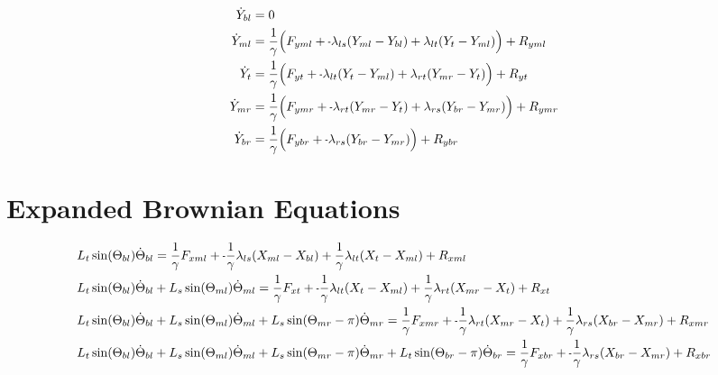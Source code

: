\documentclass[11pt, landscape]{article}
\newcommand{\mn}{\scalebox{0.7}[1.0]{-}}
\begin{document}
\begin{align}  
  \dot{Y}_{bl} &= 0 \\
  \dot{Y}_{ml} &= \frac{1}{\gamma} \Big(F_{yml} + \mn \lambda_{ls}(Y_{ml} - Y_{bl}) + \lambda_{lt}(Y_{t } - Y_{ml}) \Big) + R_{yml} \\
  \dot{Y}_{t}  &= \frac{1}{\gamma} \Big(F_{yt } + \mn \lambda_{lt}(Y_{t } - Y_{ml}) + \lambda_{rt}(Y_{mr} - Y_{t }) \Big) + R_{yt } \\
  \dot{Y}_{mr} &= \frac{1}{\gamma} \Big(F_{ymr} + \mn \lambda_{rt}(Y_{mr} - Y_{t }) + \lambda_{rs}(Y_{br} - Y_{mr}) \Big) + R_{ymr} \\
  \dot{Y}_{br} &= \frac{1}{\gamma} \Big(F_{ybr} + \mn \lambda_{rs}(Y_{br} - Y_{mr})                                 \Big) + R_{ybr}
\end{align}

\section{Expanded Brownian Equations}

\begin{align}
  &L_{t}\sin(\Theta_{bl})  \dot{\Theta}_{bl} = \frac{1}{\gamma}F_{xml} + \mn\frac{1}{\gamma}\lambda_{ls}(X_{ml} - X_{bl}) + \frac{1}{\gamma}\lambda_{lt}(X_{t } - X_{ml}) + R_{xml} \\
  &L_{t}\sin(\Theta_{bl})  \dot{\Theta}_{bl} + L_{s}\sin(\Theta_{ml})      \dot{\Theta}_{ml} = \frac{1}{\gamma}F_{xt } + \mn\frac{1}{\gamma}\lambda_{lt}(X_{t } - X_{ml}) + \frac{1}{\gamma}\lambda_{rt}(X_{mr} - X_{t }) + R_{xt } \\
  &L_{t}\sin(\Theta_{bl})  \dot{\Theta}_{bl} + L_{s}\sin(\Theta_{ml})      \dot{\Theta}_{ml} + L_{s}\sin(\Theta_{mr}-\pi)  \dot{\Theta}_{mr} = \frac{1}{\gamma}F_{xmr} + \mn\frac{1}{\gamma}\lambda_{rt}(X_{mr} - X_{t }) + \frac{1}{\gamma}\lambda_{rs}(X_{br} - X_{mr}) + R_{xmr} \\
  &L_{t}\sin(\Theta_{bl})  \dot{\Theta}_{bl} + L_{s}\sin(\Theta_{ml})      \dot{\Theta}_{ml} + L_{s}\sin(\Theta_{mr}-\pi)  \dot{\Theta}_{mr} + L_{t}\sin(\Theta_{br}-\pi)  \dot{\Theta}_{br} = \frac{1}{\gamma}F_{xbr} + \mn\frac{1}{\gamma}\lambda_{rs}(X_{br} - X_{mr}) + R_{xbr}
\end{align}
\end{document}
